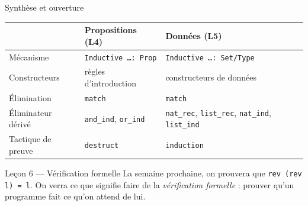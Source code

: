 \documentclass[aspectratio=169]{beamer}
\begin{document}
\begin{frame}{Synthèse et ouverture}
  \begin{center}
    \footnotesize
    \begin{tabular}{p{2.6cm}p{3.8cm}p{3.8cm}}
      \hline
      & \textbf{Propositions (L4)} & \textbf{Données (L5)} \\
      \hline
      Mécanisme & \texttt{Inductive \ldots : Prop} & \texttt{Inductive \ldots : Set/Type} \\[3pt]
      Constructeurs & règles d'introduction & constructeurs de données \\[3pt]
      Élimination & \texttt{match} & \texttt{match} \\[3pt]
      Éliminateur dérivé & \texttt{and\_ind}, \texttt{or\_ind} & \texttt{nat\_rec}, \texttt{list\_rec}, \texttt{nat\_ind}, \texttt{list\_ind} \\[3pt]
      Tactique de preuve & \texttt{destruct} & \texttt{induction} \\
      \hline
    \end{tabular}
  \end{center}
  \pause
  \bigskip
  \begin{alertblock}{Leçon 6 — Vérification formelle}
    La semaine prochaine, on prouvera que \texttt{rev (rev l) = l}. On verra ce que signifie faire
    de la \emph{vérification formelle} : prouver qu'un programme fait ce qu'on attend de lui.
  \end{alertblock}
\end{frame}
\end{document}
